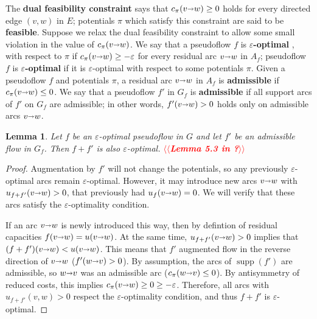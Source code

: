\documentclass[11pt]{article}
\makeatletter
\def\eps{\varepsilon}
\def\arcto{\mathord\shortrightarrow}
\def\arc#1#2{#1\arcto#2}
\def\supp{\operatorname{supp}}
\theoremstyle{plain}
\newtheorem{lemma}{Lemma}[section]
\numberwithin{figure}{section}
\def\EMPH#1{\textbf{\boldmath #1}}
\def\n@te#1{\textsf{\boldmath \textbf{$\langle\!\langle$#1$\rangle\!\rangle$}}\leavevmode}
\def\note#1{\textcolor{red}{\n@te{#1}}}
\makeatother
\begin{document}
The \EMPH{dual feasibility constraint} says that $c_\pi(\arc vw) \geq 0$ holds for every directed edge $(v,w)$ in $E$; potentials $\pi$ which satisfy this constraint are said to be \EMPH{feasible}.
%
%
Suppose we relax the dual feasibility constraint to allow some small violation in the value of $c_\pi(\arc vw)$.
We say that a pseudoflow $f$ is \EMPH{$\eps$-optimal} \cite{tar-spmcc-1985,be-darml-1987}, with respect to $\pi$ if
$c_\pi(\arc vw) \geq -\eps$ for every residual arc $\arc vw$ in $A_f$; pseudoflow $f$ is \EMPH{$\eps$-optimal} if it is $\eps$-optimal with respect to some potentials $\pi$.
%
Given a pseudoflow $f$ and potentials $\pi$, a residual arc $\arc vw$ in $A_f$ is
\EMPH{admissible} if $c_\pi(\arc vw) \leq 0$.
We say that a pseudoflow $f'$ in $G_f$ is \EMPH{admissible} if all support arcs of $f'$ on $G_f$ are admissible; in other words, $f'(\arc vw) > 0$ holds
only on admissible arcs $\arc vw$.

\begin{lemma}
Let $f$ be an $\eps$-optimal pseudoflow in $G$ and let $f'$ be an
admissible flow in $G_f$.
Then $f + f'$ is also $\eps$-optimal.
\note{Lemma 5.3 in \cite{GT90}?}
\end{lemma}

\begin{proof}
Augmentation by $f'$ will not change the potentials, so any previously
$\eps$-optimal arcs remain $\eps$-optimal.
However, it may introduce new arcs $\arc vw$ with $u_{f+f'}(\arc vw) > 0$, that previously had
$u_f(\arc vw) = 0$.
We will verify that these arcs satisfy the $\eps$-optimality condition.

If an arc $\arc vw$ is newly introduced this way, then by defintion of residual
capacities $f(\arc vw) = u(\arc vw)$.
At the same time, $u_{f+f'}(\arc vw) > 0$ implies that $(f+f')(\arc vw) < u(\arc vw)$.
This means that $f'$ augmented flow in the reverse direction of $\arc vw$
($f'(\arc wv) > 0$).
By assumption, the arcs of $\supp(f')$ are admissible, so $\arc wv$ was an
admissible arc ($c_\pi(\arc wv) \leq 0$).
By antisymmetry of reduced costs, this implies $c_\pi(\arc vw) \geq 0 \geq -\eps$.
Therefore, all arcs with $u_{f+f'}(v, w) > 0$ respect the $\eps$-optimality condition,
and thus $f+f'$ is $\eps$-optimal.
\end{proof}
\end{document}
